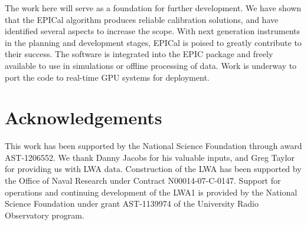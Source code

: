 \documentclass[a4paper,fleqn,usenatbib]{mnras}
\begin{document}
The work here will serve as a foundation for further development. We have shown that the 
EPICal algorithm produces reliable calibration solutions, and have identified several aspects to 
increase the scope. With next generation instruments in the planning and development stages, 
EPICal is poised to greatly contribute to their success. The software is integrated into the EPIC 
package and freely available to use in simulations or offline processing of data. Work is 
underway to port the code to real-time GPU systems for deployment. 

\section*{Acknowledgements}
This work has been supported by the National Science Foundation through award 
AST-1206552. We thank Danny Jacobs for his valuable inputs, and Greg Taylor for providing 
us with LWA data. Construction of the LWA has been supported by the Office of Naval 
Research under Contract N00014-07-C-0147. Support for operations and continuing 
development of the LWA1 is provided by the National Science Foundation under grant 
AST-1139974 of the University Radio Observatory program.






%

\bsp	%
\label{lastpage}
\end{document}
